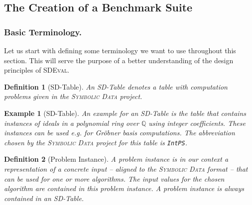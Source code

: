 \documentclass[12pt]{article}
\newtheorem{example}{Example}
\newtheorem{definition}{Definition}
\begin{document}

\subsection{The Creation of a Benchmark Suite}
\subsubsection{Basic Terminology.}

Let us start with defining some terminology we want to use throughout this
section. This will serve the purpose of a better understanding of the design
principles of \textsc{SDEval}.


\begin{definition}[SD-Table]
\label{def:SD-Table}
 An SD-Table denotes a table with computation problems given in
the \textsc{Symbolic Data} project.
\end{definition}

\begin{example}[SD-Table]
An example for an SD-Table is the table that contains instances of ideals in a
polynomial ring over $\mathbb{Q}$ using integer coefficients. These instances
can be used e.g. for Gr\"obner basis computations. The abbreviation chosen by
the \textsc{Symbolic Data} project for this table is \texttt{IntPS}.
\end{example}

\begin{definition}[Problem Instance]
\label{def:ProblemInstance}
 A problem instance is in our context a representation
of a concrete input -- aligned to the \textsc{Symbolic Data} format -- that can
be used for one or more algorithms. The input values for the chosen algorithm
are contained in this problem instance. A problem instance is always contained
in an SD-Table.
\end{definition}
\end{document}
